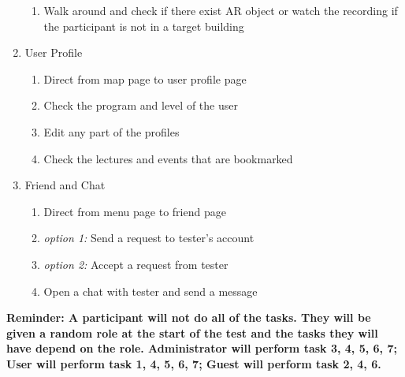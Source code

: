 \documentclass[12pt, titlepage]{article}
\begin{document}
\begin{enumerate}
\begin{enumerate}
\item Walk around and check if there exist AR object or watch the recording if the participant is not in a target building
\end{enumerate}
\item User Profile
\begin{enumerate}
\item Direct from map page to user profile page
\item Check the program and level of the user
\item Edit any part of the profiles
\item Check the lectures and events that are bookmarked
\end{enumerate}
\item Friend and Chat
\begin{enumerate}
\item Direct from menu page to friend page
\item \textit{option 1:} Send a request to tester's account
\item \textit{option 2:} Accept a request from tester
\item Open a chat with tester and send a message
\end{enumerate}
\end{enumerate}
\textbf{Reminder: A participant will not do all of the tasks. They will be given a random role at the start of the test and the tasks they will have depend on the role. Administrator will perform task 3, 4, 5, 6, 7; User will perform task 1, 4, 5, 6, 7; Guest will perform task 2, 4, 6.}
\end{document}
